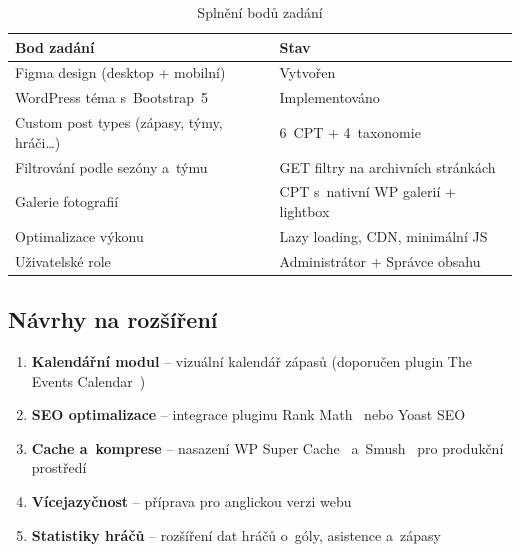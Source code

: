 \documentclass[12pt,a4paper]{article}
\begin{document}
\begin{table}[H]
\centering
\begin{tabularx}{\textwidth}{X l}
\toprule
\textbf{Bod zadání} & \textbf{Stav} \\
\midrule
Figma design (desktop + mobilní) & Vytvořen \\
WordPress téma s~Bootstrap~5 & Implementováno \\
Custom post types (zápasy, týmy, hráči\ldots) & 6~CPT + 4~taxonomie \\
Filtrování podle sezóny a~týmu & GET filtry na archivních stránkách \\
Galerie fotografií & CPT s~nativní WP galerií + lightbox \\
Optimalizace výkonu & Lazy loading, CDN, minimální JS \\
Uživatelské role & Administrátor + Správce obsahu \\
\bottomrule
\end{tabularx}
\caption{Splnění bodů zadání}
\end{table}

\subsection*{Návrhy na rozšíření}

\begin{enumerate}
    \item \textbf{Kalendářní modul} -- vizuální kalendář zápasů (doporučen plugin The Events Calendar~\cite{eventscalendar})
    \item \textbf{SEO optimalizace} -- integrace pluginu Rank Math~\cite{rankmath} nebo Yoast SEO~\cite{yoast}
    \item \textbf{Cache a~komprese} -- nasazení WP Super Cache~\cite{wpsupercache} a~Smush~\cite{smush} pro produkční prostředí
    \item \textbf{Vícejazyčnost} -- příprava pro anglickou verzi webu
    \item \textbf{Statistiky hráčů} -- rozšíření dat hráčů o~góly, asistence a~zápasy
\end{enumerate}

\end{document}
